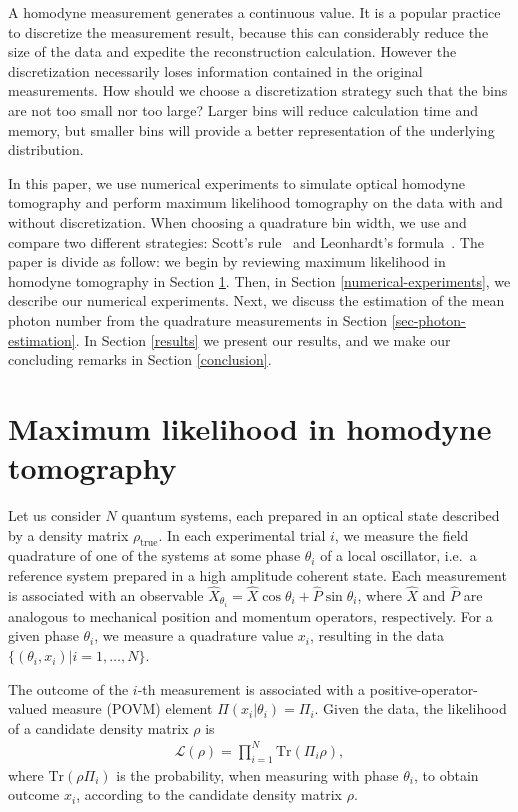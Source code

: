 \documentclass[
reprint,
superscriptaddress,
showpacs,
amsmath,
amssymb,
aps,
pra,
longbibliography
]{revtex4-1}
\newcommand{\rhotrue}{\rho_{\text{true}}}
\begin{document}
A homodyne measurement generates a continuous value.  It is a
  popular practice to discretize the measurement result, because this
  can considerably reduce the size of the data and expedite the
  reconstruction calculation.  However the discretization necessarily
  loses information contained in the original measurements.
 How should we choose a discretization strategy such that the bins are not too small nor too large? Larger bins will reduce calculation time and memory, but
smaller bins will provide a better representation of the underlying distribution.
 
In this paper, we use numerical experiments to simulate optical
homodyne tomography and perform maximum likelihood tomography on the
data with and without discretization. When choosing a quadrature bin
width, we use and compare two different strategies: Scott's
rule~\cite{Scott2010} and Leonhardt's formula~\cite{Leonhardt1996}.
The paper is divide as follow: we begin by reviewing maximum
likelihood in homodyne tomography in Section \ref{MLE}. Then, in
Section \ref{numerical-experiments}, we describe our numerical
experiments. Next, we discuss the estimation of the mean photon number
from the quadrature measurements in Section
\ref{sec-photon-estimation}. In Section \ref{results} we present our
results, and we make our concluding remarks in Section
\ref{conclusion}.

\section{Maximum likelihood in homodyne tomography}
\label{MLE}
Let us consider $N$ quantum systems, each prepared in an optical state
described by a density matrix $\rhotrue$. In each experimental trial
$i$, we measure the field quadrature of one of the systems at some
phase $\theta_i$ of a local oscillator, i.e.\ a reference system
prepared in a high amplitude coherent state.  Each measurement is
associated with an observable
$\hat{X}_{\theta_i} = \hat{X} \cos \theta_i + \hat{P} \sin \theta_i$,
where $\hat{X}$ and $\hat{P}$ are analogous to mechanical position and
momentum operators, respectively. For a given phase $\theta_i$, we
measure a quadrature value $x_i$, resulting in the data
$\{(\theta_i, x_i)| i = 1, \ldots, N\}$.

The outcome of the $i$-th measurement is associated with a
positive-operator-valued measure (POVM) element
$\Pi (x_i|\theta_i) = \Pi_i$. Given the data, the likelihood
of a candidate density matrix $\rho$ is
\begin{eqnarray}
  \mathcal{L} (\rho)= \prod_{i=1}^{N} \mathrm{Tr} (\Pi_i \rho),
  \label{eq-likelihood}
\end{eqnarray}
where $\mathrm{Tr}(\rho \Pi_i)$ is the probability, when measuring
with phase $\theta_i$, to obtain outcome $x_i$, according to the
candidate density matrix $\rho$.
\end{document}
